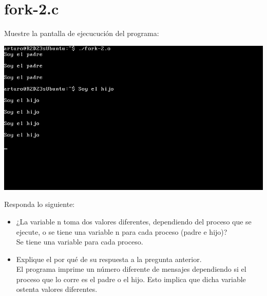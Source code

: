 \section{fork-2.c}

	Muestre la pantalla de ejecucución del programa:

	\begin{center}
		\includegraphics[width=\linewidth]{imagenes/fork-2.png}
	\end{center}

	Responda lo siguiente:

	\begin{itemize}

		\item ¿La variable n toma dos valores diferentes, dependiendo del proceso que se ejecute, o se tiene una variable n para cada proceso (padre e hijo)?\\
		Se tiene una variable para cada proceso.
		\item Explique el por qué de su respuesta a la pregunta anterior.\\
		El programa imprime un número diferente de mensajes dependiendo si el proceso que lo corre es el padre o el hijo. Esto implica que dicha variable ostenta valores diferentes.

	\end{itemize}
